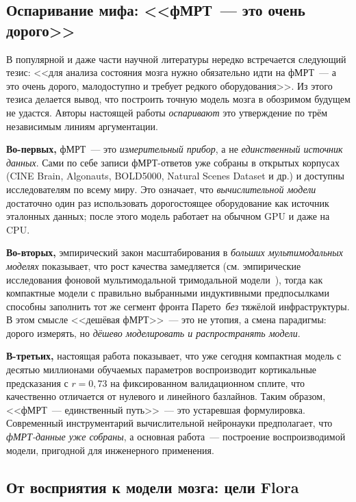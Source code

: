 \documentclass[11pt,a4paper]{article}
\begin{document}
\subsection{Оспаривание мифа: <<фМРТ~--- это очень дорого>>}
\label{sec:intro-myth}

В популярной и даже части научной литературы нередко встречается
следующий тезис: <<для анализа состояния мозга нужно обязательно идти на
фМРТ~--- а это очень дорого, малодоступно и требует редкого
оборудования>>. Из этого тезиса делается вывод, что построить точную
модель мозга в обозримом будущем не удастся. Авторы настоящей работы
\emph{оспаривают} это утверждение по трём независимым линиям
аргументации.

\textbf{Во-первых,} фМРТ~--- это \emph{измерительный прибор}, а не
\emph{единственный источник данных}. Сами по себе записи фМРТ-ответов
уже собраны в открытых корпусах (CINE Brain, Algonauts, BOLD5000,
Natural Scenes Dataset и др.) и доступны исследователям по всему миру.
Это означает, что \emph{вычислительной модели} достаточно один раз
использовать дорогостоящее оборудование как источник эталонных данных;
после этого модель работает на обычном GPU и даже на CPU.

\textbf{Во-вторых,} эмпирический закон масштабирования в
\emph{больших мультимодальных моделях} показывает, что рост качества
замедляется (см. эмпирические исследования фоновой мультимодальной тримодальной модели~\cite{dAscoli2026tribe,dAscoli2026tribev2}), тогда как компактные модели с
правильно выбранными индуктивными предпосылками способны заполнить тот
же сегмент фронта Парето~\emph{без} тяжёлой инфраструктуры. В этом
смысле <<дешёвая фМРТ>>~--- это не утопия, а смена парадигмы: дорого
измерять, но \emph{дёшево моделировать и распространять модели}.

\textbf{В-третьих,} настоящая работа показывает, что уже сегодня
компактная модель с десятью миллионами обучаемых параметров
воспроизводит кортикальные предсказания с $r = 0{,}73$ на
фиксированном валидационном сплите, что качественно отличается
от нулевого и линейного базлайнов. Таким образом, <<фМРТ~--- единственный
путь>>~--- это устаревшая формулировка. Современный инструментарий
вычислительной нейронауки предполагает, что \emph{фМРТ-данные уже
собраны}, а основная работа~--- построение воспроизводимой модели,
пригодной для инженерного применения.

\subsection{От восприятия к модели мозга: цели Flora}
\label{sec:intro-goals}
\end{document}
